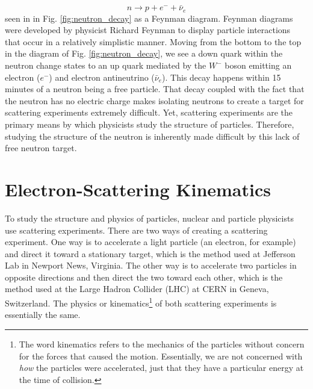 \begin{equation}
n \longrightarrow p + e^{-} + \bar{\nu}_{e}
\end{equation}
seen in in Fig. \ref{fig:neutron_decay} as a Feynman diagram. Feynman diagrams were developed by physicist Richard Feynman to display particle interactions that occur in a relatively simplistic manner. Moving from the bottom to the top in the diagram of Fig. \ref{fig:neutron_decay}, we see a down quark within the neutron change states to an up quark mediated by the $W^-$ boson emitting an electron ($e^-$) and electron antineutrino ($\bar{\nu}_{e}$). This decay happens within 15 minutes of a neutron being a free particle. That decay coupled with the fact that the neutron has no electric charge makes isolating neutrons to create a target for scattering experiments extremely difficult. Yet, scattering experiments are the primary means by which physicists study the structure of particles. Therefore, studying the structure of the neutron is inherently made difficult by this lack of free neutron target.

\section{Electron-Scattering Kinematics}
To study the structure and physics of particles, nuclear and particle physicists use scattering experiments. There are two ways of creating a scattering experiment. One way is to accelerate a light particle (an electron, for example) and direct it toward a stationary target, which is the method used at Jefferson Lab in Newport News, Virginia. The other way is to accelerate two particles in opposite directions and then direct the two toward each other, which is the method used at the Large Hadron Collider (LHC) at CERN in Geneva, Switzerland. The physics or kinematics\footnote{The word kinematics refers to the mechanics of the particles without concern for the forces that caused the motion. Essentially, we are not concerned with \textit{how} the particles were accelerated, just that they have a particular energy at the time of collision.} of both scattering experiments is essentially the same. 

